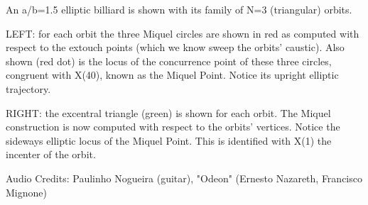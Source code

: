 An a/b=1.5 elliptic billiard is shown with its family of N=3 (triangular) orbits.

LEFT: for each orbit the three Miquel circles are shown in red as computed with respect to the extouch points (which we know sweep the orbits' caustic). Also shown (red dot) is the locus of the concurrence point of these three circles, congruent with X(40), known as the Miquel Point. Notice its upright elliptic trajectory.

RIGHT: the excentral triangle (green) is shown for each orbit. The Miquel construction is now computed with respect to the orbits' vertices. Notice the sideways elliptic locus of the Miquel Point. This is identified with X(1) the incenter of the orbit.

Audio Credits: Paulinho Nogueira (guitar), "Odeon" (Ernesto Nazareth, Francisco Mignone)